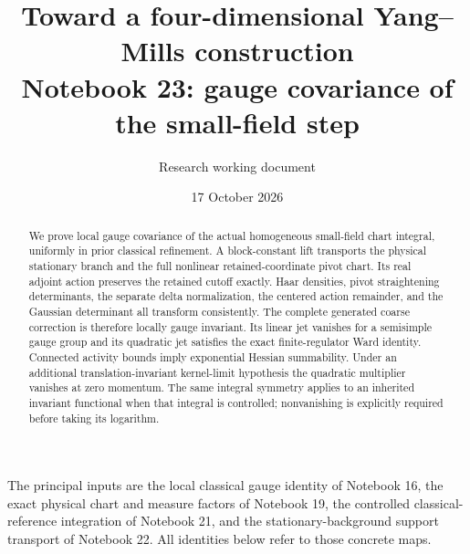 \documentclass[11pt]{article}
\title{Toward a four-dimensional Yang--Mills construction\\
\large Notebook 23: gauge covariance of the small-field step}
\author{Research working document}
\date{17 October 2026}
\theoremstyle{remark}
\begin{document}
\maketitle
\begin{abstract}
We prove local gauge covariance of the actual homogeneous
small-field chart integral, uniformly in prior classical
refinement. A block-constant lift transports the physical
stationary branch and the full nonlinear retained-coordinate
pivot chart. Its real adjoint action preserves the retained
cutoff exactly. Haar densities, pivot straightening determinants,
the separate delta normalization, the centered action remainder,
and the Gaussian determinant all transform consistently.
The complete generated coarse correction is therefore locally
gauge invariant. Its linear jet vanishes for a semisimple gauge
group and its quadratic jet satisfies the exact finite-regulator
Ward identity. Connected activity bounds imply exponential
Hessian summability. Under an additional translation-invariant
kernel-limit hypothesis the quadratic multiplier vanishes
at zero momentum. The same integral symmetry applies to an
inherited invariant functional when that integral is controlled;
nonvanishing is explicitly required before taking its logarithm.
\end{abstract}

The principal inputs are the local classical gauge identity of
Notebook 16, the exact physical chart and measure factors of
Notebook 19, the controlled classical-reference integration of
Notebook 21, and the stationary-background support transport of
Notebook 22. All identities below refer to those concrete maps.
\end{document}
